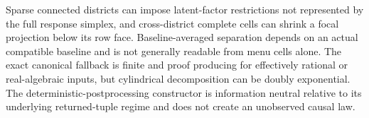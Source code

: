 Sparse connected districts can impose latent-factor restrictions not represented by the full response simplex, and cross-district complete cells can shrink a focal projection below its row face.  Baseline-averaged separation depends on an actual compatible baseline and is not generally readable from menu cells alone.  The exact canonical fallback is finite and proof producing for effectively rational or real-algebraic inputs, but cylindrical decomposition can be doubly exponential.  The deterministic-postprocessing constructor is information neutral relative to its underlying returned-tuple regime and does not create an unobserved causal law.